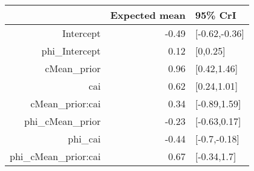\begin{tabular}{rrl}
  \hline
 & Expected mean & 95\% CrI \\ 
  \hline
Intercept & -0.49 & [-0.62,-0.36] \\ 
  phi\_Intercept & 0.12 & [0,0.25] \\ 
  cMean\_prior & 0.96 & [0.42,1.46] \\ 
  cai & 0.62 & [0.24,1.01] \\ 
  cMean\_prior:cai & 0.34 & [-0.89,1.59] \\ 
  phi\_cMean\_prior & -0.23 & [-0.63,0.17] \\ 
  phi\_cai & -0.44 & [-0.7,-0.18] \\ 
  phi\_cMean\_prior:cai & 0.67 & [-0.34,1.7] \\ 
   \hline
\end{tabular}

